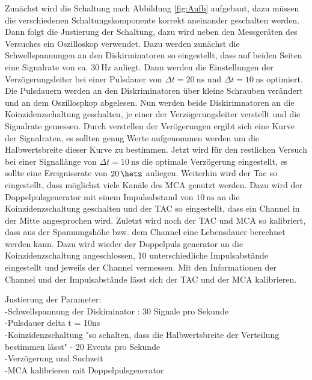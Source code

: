 	Zunächst wird die Schaltung nach Abbildung \ref{fig:Aufb} aufgebaut, dazu müssen die verschiedenen Schaltungskomponente korrekt aneinander geschalten werden.
	Dann folgt die Justierung der Schaltung, dazu wird neben den Messgeräten des Versuches ein Oszilloskop verwendet.
	Dazu werden zunächst die Schwellspannungen an den Diskirminatoren so eingestellt, dass auf beiden Seiten eine Signalrate von ca. $\SI{30}{\hertz}$ anliegt. 
    Dann werden die Einstellungen der Verzögerungsleiter bei einer Pulsdauer von $\Delta t= \SI{20}{\nano\second}$ und $\Delta t= \SI{10}{\nano\second}$ optimiert.
	Die Pulsdauern werden an den Diskriminatoren über kleine Schrauben verändert und an dem Oszillospkop abgelesen.
	Nun werden beide Diskirimnatoren an die Koinzidenzschaltung geschalten, je einer der Verzögerungsleiter verstellt und die Signalrate gemessen.
	Durch verstellen der Verögerungen ergibt sich eine Kurve der Signalraten, es sollten genug Werte aufgenommen werden um die Halbwertsbreite dieser Kurve zu bestimmen.
	Jetzt wird für den restlichen Versuch bei einer Signallänge von $\Delta t= \SI{10}{\nano\second}$ die optimale Verzögerung eingestellt, es sollte eine Ereignissrate von $\SI{20}{\hetz}$ anliegen.
	Weiterhin wird der Tac so eingestellt, dass möglichst viele Kanäle des MCA genutzt werden.
	Dazu wird der Doppelpulsgenerator mit einem Impulsabstand von $\SI{10}{\nano\second}$ an die Koinzidenzschaltung geschalten und der TAC so eingestellt, dass ein Channel in der Mitte angesprochen wird.
	Zuletzt wird noch der TAC und MCA so kalibriert, dass aus der Spannungshöhe bzw. dem Channel eine Lebensdauer berechnet werden kann.
	Dazu wird wieder der Doppelpuls generator an die Koinzidenzschaltung angeschlossen, 10 unterschiedliche Impulsabstände eingestellt und jeweils der Channel vermessen.
	Mit den Informationen der Channel und der Impulsabstände lässt sich der TAC und der MCA kalibrieren.

    Justierung der Parameter:\\
    -Schwellspannung der Diskiminator : 30 Signale pro Sekunde\\
    -Pulsdauer delta t = 10ns\\
    -Koinzidenzschaltung "so schalten, dass die Halbwertsbreite der Verteilung bestimmen lässt" - 20 Events pro Sekunde\\
    -Verzögerung und Suchzeit \\
    -MCA kalibrieren mit Doppelpulsgenerator\\
